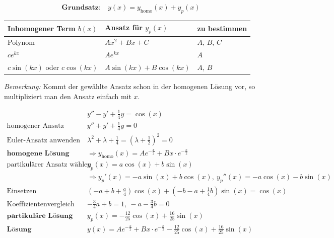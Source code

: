 \documentclass[11pt]{article}
\begin{document}
\begin{equation*}
	\textbf{Grundsatz:}\quad y(x) = y_\text{homo}(x) + y_p(x)
\end{equation*}

\begin{table}[H]
\centering
\begin{tabular}{|l|l|l|}
\hline
\textbf{Inhomogener Term $b(x)$} & \textbf{Ansatz f{\"u}r $y_p(x)$}	& \textbf{zu bestimmen}		\\ \hline
Polynom				& $Ax^2 + Bx + C$			& $A$, $B$, $C$		\\ \hline
$c e^{k x}$ & $Ae^{kx}$					& $A$				\\ \hline
$c\sin(kx)$ oder $c\cos(kx)$ & $A\sin(kx) + B\cos(kx)$ & $A$, $B$ \\ \hline

\end{tabular}
\end{table}

\emph{Bemerkung:} Kommt der gew{\"a}hlte Ansatz schon in der homogenen L{\"o}sung vor, so multipliziert man den Ansatz einfach mit $x$.

\begin{equation*}
\begin{split}
	& y'' - y' + \frac{1}{4}y = \cos(x) \\
	\text{homogener Ansatz}\quad & y'' + y' + \frac{1}{4}y = 0 \\
	\text{Euler-Ansatz anwenden}\quad & \lambda^2 + \lambda + \frac{1}{4} = (\lambda + \frac{1}{2})^2 = 0 \\
	\textbf{homogene L{\"o}sung}\quad &\Rightarrow y_\text{homo}(x) = Ae^{-\frac{x}{2}} + Bx \cdot e^{-\frac{x}{2}} \\
	\text{partikul{\"a}rer Ansatz w{\"a}hlen}\quad & y_p(x) = a\cos(x) + b\sin(x) \\
							  & \Rightarrow y_p'(x) = -a\sin(x) + b\cos(x),\  y_p''(x) = -a\cos(x) -b \sin(x) \\
	\text{Einsetzen}\quad & (-a + b + \frac{a}{4})\cos(x) + (-b -a + \frac{1}{4}b)\sin(x) = \cos(x) \\
	\text{Koeffizientenvergleich}\quad & -\frac{3}{4}a + b = 1,\ -a-\frac{3}{4}b = 0 \\
	\textbf{partikul{\"a}re L{\"o}sung}\quad & y_p(x) = -\frac{12}{25}\cos(x) + \frac{16}{25}\sin(x) \\
	\textbf{L{\"o}sung}\quad & y(x) = Ae^{-\frac{x}{2}} + Bx \cdot e^{-\frac{x}{2}} -\frac{12}{25}\cos(x) + \frac{16}{25}\sin(x)
\end{split}
\end{equation*}
\end{document}
